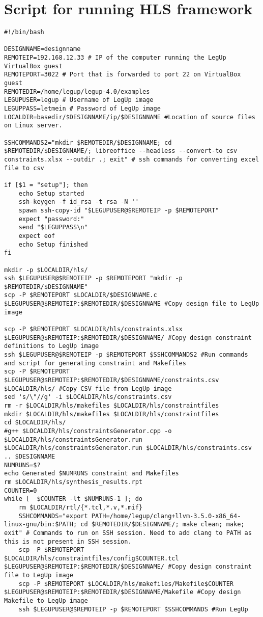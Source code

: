 \section{\label{{sec:hlsscript}}Script for running HLS framework}
\lstset{language=[gnu] make, style=Cstyle}
\begin{lstlisting}[caption={HLS Script source code}label=lst:hlsscript]
#!/bin/bash

DESIGNNAME=designname
REMOTEIP=192.168.12.33 # IP of the computer running the LegUp VirtualBox guest
REMOTEPORT=3022 # Port that is forwarded to port 22 on VirtualBox guest
REMOTEDIR=/home/legup/legup-4.0/examples
LEGUPUSER=legup # Username of LegUp image
LEGUPPASS=letmein # Password of LegUp image
LOCALDIR=basedir/$DESIGNNAME/ip/$DESIGNNAME #Location of source files on Linux server.

SSHCOMMANDS2="mkdir $REMOTEDIR/$DESIGNNAME; cd $REMOTEDIR/$DESIGNNAME/; libreoffice --headless --convert-to csv constraints.xlsx --outdir .; exit" # ssh commands for converting excel file to csv

if [$1 = "setup"]; then
	echo Setup started
	ssh-keygen -f id_rsa -t rsa -N ''
	spawn ssh-copy-id "$LEGUPUSER@$REMOTEIP -p $REMOTEPORT"
	expect "password:"
	send "$LEGUPPASS\n"
	expect eof
	echo Setup finished
fi

mkdir -p $LOCALDIR/hls/
ssh $LEGUPUSER@$REMOTEIP -p $REMOTEPORT "mkdir -p $REMOTEDIR/$DESIGNNAME"
scp -P $REMOTEPORT $LOCALDIR/$DESIGNNAME.c $LEGUPUSER@$REMOTEIP:$REMOTEDIR/$DESIGNNAME #Copy design file to LegUp image

scp -P $REMOTEPORT $LOCALDIR/hls/constraints.xlsx $LEGUPUSER@$REMOTEIP:$REMOTEDIR/$DESIGNNAME/ #Copy design constraint definitions to LegUp image
ssh $LEGUPUSER@$REMOTEIP -p $REMOTEPORT $SSHCOMMANDS2 #Run commands and script for generating constraint and Makefiles
scp -P $REMOTEPORT $LEGUPUSER@$REMOTEIP:$REMOTEDIR/$DESIGNNAME/constraints.csv $LOCALDIR/hls/ #Copy CSV file from LegUp image
sed 's/\"//g' -i $LOCALDIR/hls/constraints.csv
rm -r $LOCALDIR/hls/makefiles $LOCALDIR/hls/constraintfiles
mkdir $LOCALDIR/hls/makefiles $LOCALDIR/hls/constraintfiles
cd $LOCALDIR/hls/
#g++ $LOCALDIR/hls/constraintsGenerator.cpp -o $LOCALDIR/hls/constraintsGenerator.run
$LOCALDIR/hls/constraintsGenerator.run $LOCALDIR/hls/constraints.csv .. $DESIGNNAME
NUMRUNS=$?
echo Generated $NUMRUNS constraint and Makefiles
rm $LOCALDIR/hls/synthesis_results.rpt
COUNTER=0
while [  $COUNTER -lt $NUMRUNS-1 ]; do
	rm $LOCALDIR/rtl/{*.tcl,*.v,*.mif}
	SSHCOMMANDS="export PATH=/home/legup/clang+llvm-3.5.0-x86_64-linux-gnu/bin:$PATH; cd $REMOTEDIR/$DESIGNNAME/; make clean; make; exit" # Commands to run on SSH session. Need to add clang to PATH as this is not present in SSH session.
	scp -P $REMOTEPORT $LOCALDIR/hls/constraintfiles/config$COUNTER.tcl $LEGUPUSER@$REMOTEIP:$REMOTEDIR/$DESIGNNAME/ #Copy design constraint file to LegUp image
	scp -P $REMOTEPORT $LOCALDIR/hls/makefiles/Makefile$COUNTER $LEGUPUSER@$REMOTEIP:$REMOTEDIR/$DESIGNNAME/Makefile #Copy design Makefile to LegUp image
	ssh $LEGUPUSER@$REMOTEIP -p $REMOTEPORT $SSHCOMMANDS #Run LegUp
	

\end{lstlisting}

